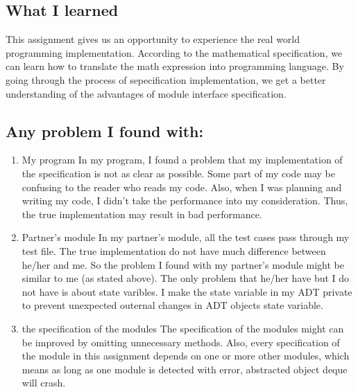 \documentclass[12pt]{article}
\begin{document}
  \subsection {What I learned}
  This assignment gives us an opportunity to experience 
  the real world programming implementation. According
  to the mathematical specification, we can learn how to
  translate the math expression into programming language.
  By going through the process of sepecification
  implementation, we get a better understanding of the
  advantages of module interface specification.

  \subsection {Any problem I found with: }
  \begin{enumerate}
    \item My program
    \newline In my program, I found a problem that my
    implementation of the specification is not as clear
    as possible. Some part of my code may be confusing
    to the reader who reads my code. Also, when I was
    planning and writing my code, I didn't take the 
    performance into my consideration. Thus, the true
    implementation may result in bad performance.

    \item Partner's module
    \newline In my partner's module, all the test cases
    pass through my test file. The true implementation
    do not have much difference between he/her and me.
    So the problem I found with my partner's module 
    might be similar to me (as stated above). The only
    problem that he/her have but I do not have is about
    state varibles. I make the state variable in my ADT
    private to prevent unexpected outernal changes in 
    ADT objects state variable.

    \item the specification of the modules
    \newline The specification of the modules might can 
    be improved by omitting unnecessary methods. Also, 
    every specification of the module in this assignment 
    depends on one or more other modules, which means as 
    long as one module is detected with error, abstracted 
    object deque will crash.
  \end{enumerate}
\end{document}
